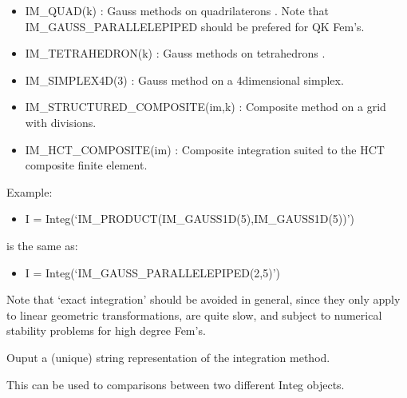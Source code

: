 \documentclass[a4paper,11pt,english]{sphinxmanual}
\begin{document}
\begin{fulllineitems}
\begin{itemize}
\begin{itemize}
\item {} 
IM\_QUAD(k) :
Gauss methods on quadrilaterons . Note that
IM\_GAUSS\_PARALLELEPIPED should be prefered for QK Fem’s.

\item {} 
IM\_TETRAHEDRON(k) :
Gauss methods on tetrahedrons .

\item {} 
IM\_SIMPLEX4D(3) :
Gauss method on a 4\sphinxhyphen{}dimensional simplex.

\item {} 
IM\_STRUCTURED\_COMPOSITE(im,k) :
Composite method on a grid with  divisions.

\item {} 
IM\_HCT\_COMPOSITE(im) :
Composite integration suited to the HCT composite finite element.

\end{itemize}

Example:
\begin{itemize}
\item {} 
I = Integ(‘IM\_PRODUCT(IM\_GAUSS1D(5),IM\_GAUSS1D(5))’)

\end{itemize}

is the same as:
\begin{itemize}
\item {} 
I = Integ(‘IM\_GAUSS\_PARALLELEPIPED(2,5)’)

\end{itemize}

Note that ‘exact integration’ should be avoided in general, since they
only apply to linear geometric transformations, are quite slow, and
subject to numerical stability problems for high degree Fem’s.

\end{itemize}

\begin{fulllineitems}
\label{\detokenize{python/cmdref_Integ:getfem.Integ.char}}
Ouput a (unique) string representation of the integration method.

This can be used to  comparisons between two different Integ
objects.

\end{fulllineitems}



\end{fulllineitems}
\end{document}
